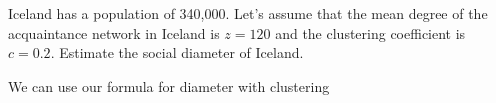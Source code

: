 
Iceland has a population of 340,000. Let's assume that the mean degree of the acquaintance network in Iceland is $z=120$ and the clustering coefficient is $c=0.2$. Estimate the social diameter of Iceland. 

\solution
We can use our formula for diameter with clustering
